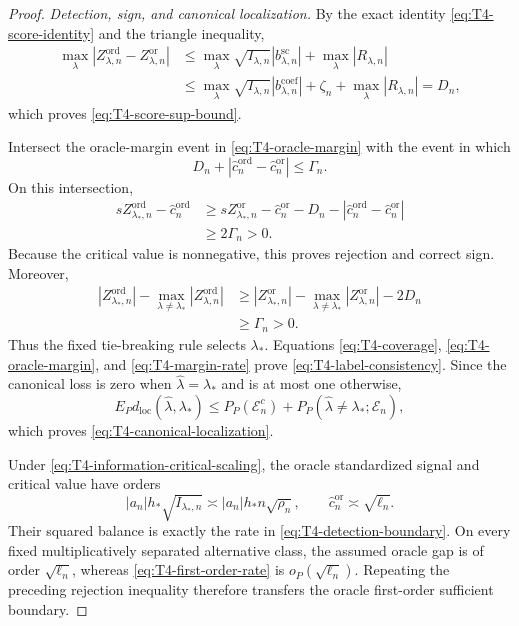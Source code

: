 \documentclass[11pt]{article}
\theoremstyle{definition}
\newcommand{\1}{\mathbf 1}\newcommand{\op}{\operatorname}
\begin{document}
\begin{proof}
\emph{Detection, sign, and canonical localization.}
By the exact identity \eqref{eq:T4-score-identity} and the triangle
inequality,
\begin{align*}
 \max_\lambda|Z_{\lambda,n}^{\mathrm{ord}}
                   -Z_{\lambda,n}^{\mathrm{or}}|
 &\le\max_\lambda\sqrt{I_{\lambda,n}}
       |b_{\lambda,n}^{\mathrm{sc}}|
       +\max_\lambda|R_{\lambda,n}|\\
 &\le\max_\lambda\sqrt{I_{\lambda,n}}
       |b_{\lambda,n}^{\mathrm{coef}}|
       +\zeta_n+\max_\lambda|R_{\lambda,n}|=D_n,
\end{align*}
which proves \eqref{eq:T4-score-sup-bound}.

Intersect the oracle-margin event in \eqref{eq:T4-oracle-margin} with
the event in which
\[
 D_n+|\widehat c_n^{\mathrm{ord}}
        -\widehat c_n^{\mathrm{or}}|\le\Gamma_n.
\]
On this intersection,
\begin{align*}
 sZ_{\lambda_*,n}^{\mathrm{ord}}
 -\widehat c_n^{\mathrm{ord}}
 &\ge sZ_{\lambda_*,n}^{\mathrm{or}}
       -\widehat c_n^{\mathrm{or}}
       -D_n
       -|\widehat c_n^{\mathrm{ord}}
          -\widehat c_n^{\mathrm{or}}|\\
 &\ge2\Gamma_n>0.
\end{align*}
Because the critical value is nonnegative, this proves rejection and
correct sign.  Moreover,
\begin{align*}
 |Z_{\lambda_*,n}^{\mathrm{ord}}|
 -\max_{\lambda\ne\lambda_*}|Z_{\lambda,n}^{\mathrm{ord}}|
 &\ge |Z_{\lambda_*,n}^{\mathrm{or}}|
 -\max_{\lambda\ne\lambda_*}|Z_{\lambda,n}^{\mathrm{or}}|
 -2D_n\\
 &\ge\Gamma_n>0.
\end{align*}
Thus the fixed tie-breaking rule selects $\lambda_*$.  Equations
\eqref{eq:T4-coverage}, \eqref{eq:T4-oracle-margin}, and
\eqref{eq:T4-margin-rate} prove
\eqref{eq:T4-label-consistency}.  Since the canonical loss is zero
when $\widehat\lambda=\lambda_*$ and is at most one otherwise,
\[
 E_Pd_{\mathrm{loc}}(\widehat\lambda,\lambda_*)
 \le P_P(\mathcal E_n^c)
    +P_P(\widehat\lambda\ne\lambda_*;\mathcal E_n),
\]
which proves \eqref{eq:T4-canonical-localization}.

Under \eqref{eq:T4-information-critical-scaling}, the oracle
standardized signal and critical value have orders
\[
 |a_n|h_*\sqrt{I_{\lambda_*,n}}
 \asymp |a_n|h_*n\sqrt{\rho_n},
 \qquad
 \widehat c_n^{\mathrm{or}}\asymp\sqrt{\ell_n}.
\]
Their squared balance is exactly the rate in
\eqref{eq:T4-detection-boundary}.  On every fixed multiplicatively
separated alternative class, the assumed oracle gap is of order
$\sqrt{\ell_n}$, whereas \eqref{eq:T4-first-order-rate} is
$o_P(\sqrt{\ell_n})$.  Repeating the preceding rejection inequality
therefore transfers the oracle first-order sufficient boundary.


\end{proof}
\end{document}
